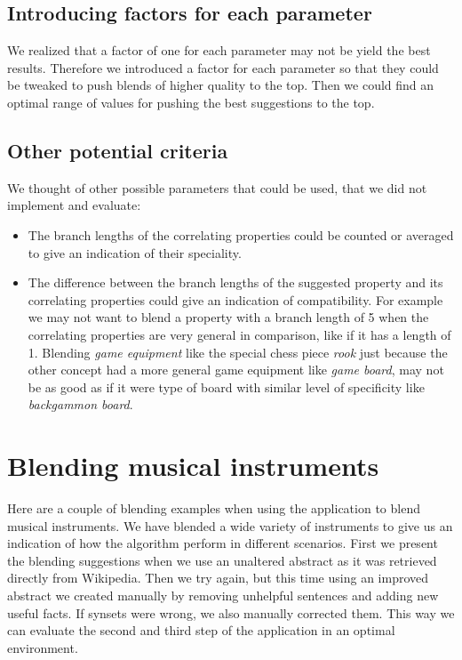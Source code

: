 \subsection{Introducing factors for each parameter}
We realized that a factor of one for each parameter may not be yield the best results. Therefore we introduced a factor for each parameter so that they could be tweaked to push blends of higher quality to the top. Then we could find an optimal range of values for pushing the best suggestions to the top.

\subsection{Other potential criteria}
We thought of other possible parameters that could be used, that we did not implement and evaluate:
\begin{itemize}
\item The branch lengths of the correlating properties could be counted or averaged to give an indication of their speciality.
\item The difference between the branch lengths of the suggested property and its correlating properties could give an indication of compatibility. For example we may not want to blend a property with a branch length of 5 when the correlating properties are very general in comparison, like if it has a length of 1. Blending \emph{game equipment} like the special chess piece \emph{rook} just because the other concept had a more general game equipment like \emph{game board}, may not be as good as if it were type of board with similar level of specificity like \emph{backgammon board}.
\end{itemize}

\section{Blending musical instruments}


Here are a couple of blending examples when using the application to blend musical instruments. We have blended a wide variety of instruments to give us an indication of how the algorithm perform in different scenarios. First we present the blending suggestions when we use an unaltered abstract as it was retrieved directly from Wikipedia. Then we try again, but this time using an improved abstract we created manually by removing unhelpful sentences and adding new useful facts. If synsets were wrong, we also manually corrected them. This way we can evaluate the second and third step of the application in an optimal environment.

